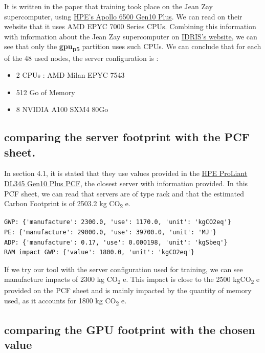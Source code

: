 \documentclass[11pt]{article}
\begin{document}
It is written in the paper that training took place on the Jean Zay
supercomputer, using \href{https://buy.hpe.com/fr/fr/compute/apollo-systems/apollo-6500-system/apollo-6500-system/hpe-apollo-6500-gen10-plus-system/p/1013092236}{HPE's Apollo 6500 Gen10 Plus}. We can read on
their website that it uses AMD EPYC 7000 Series CPUs. Combining this
information with information about the Jean Zay supercomputer on
\href{http://www.idris.fr/jean-zay/cpu/jean-zay-cpu-hw.html\#gpu\_p13}{IDRIS's website}, we can see that only the \textbf{\textbf{gpu\textsubscript{p5}}}  partition uses
such CPUs. 
We can conclude that for each of the 48 used nodes, the server
configuration is :
\begin{itemize}
\item 2 CPUs : AMD Milan EPYC 7543
\item 512 Go of Memory
\item 8 NVIDIA A100 SXM4 80Go
\end{itemize}

\subsection{comparing the server footprint with the PCF sheet.}
\label{sec:orgd9d1305}

In section 4.1, it is stated that they use values provided in the
\href{https://www.hpe.com/psnow/doc/a50005151enw}{HPE ProLiant DL345 Gen10 Plus PCF}, the closest server with
information provided. In this PCF sheet, we can read that servers
are of type rack and that the estimated Carbon Footprint is of
2503.2 kg CO\textsubscript{2} e.

\begin{verbatim}
GWP: {'manufacture': 2300.0, 'use': 1170.0, 'unit': 'kgCO2eq'}
PE: {'manufacture': 29000.0, 'use': 39700.0, 'unit': 'MJ'}
ADP: {'manufacture': 0.17, 'use': 0.000198, 'unit': 'kgSbeq'}
RAM impact GWP: {'value': 1800.0, 'unit': 'kgCO2eq'}
\end{verbatim}


If we try our tool with the server configuration used for training, we
can see manufacture impacts of 2300 kg CO\textsubscript{2} e. This impact is close
to the 2500 kgCO\textsubscript{2} e provided on the PCF sheet and is mainly impacted
by the quantity of memory used, as it accounts for 1800 kg CO\textsubscript{2} e.

\subsection{comparing the GPU footprint with the chosen value}
\label{sec:orgc0de4b1}
\end{document}
